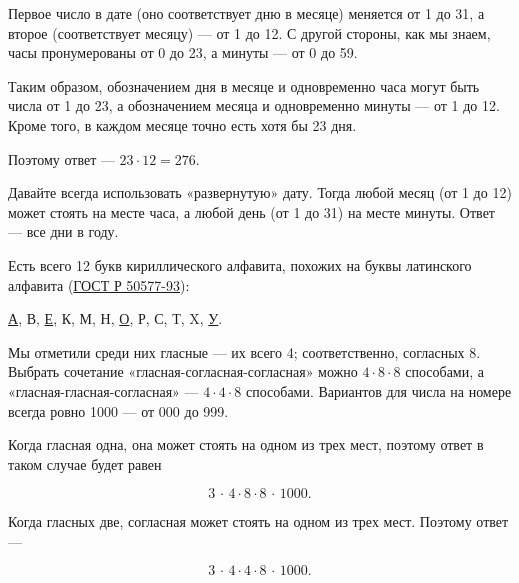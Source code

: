 ﻿
\begin{itemize}
\itA Первое число в дате (оно соответствует дню в месяце) меняется от 1 до 31, а второе (соответствует месяцу) — от 1 до 12. С другой стороны, как мы знаем, часы пронумерованы от 0 до 23, а минуты — от 0 до 59.

\ms Таким образом, обозначением дня в месяце и одновременно часа могут быть числа от 1 до 23, а обозначением месяца и одновременно минуты — от 1 до 12. Кроме того, в каждом месяце точно есть хотя бы 23 дня.

\ms Поэтому ответ — $23 \cdot 12 = 276$.

\itB Давайте всегда использовать «развернутую» дату. Тогда любой месяц (от 1 до 12) может стоять на месте часа, а любой день (от 1 до 31) на месте минуты. Ответ — все дни в году.

\itC Есть всего 12 букв кириллического алфавита, похожих на буквы латинского алфавита (\href{http://base.garant.ru/12142212}{ГОСТ Р 50577-93}): \medskip

\centerline{{\underline А}, В, {\underline Е}, К, М, Н, {\underline О}, Р, С, Т, X, {\underline У}.}

\ms Мы отметили среди них гласные — их всего 4; соответственно, согласных 8. Выбрать сочетание «гласная-согласная-согласная» можно $4 \cdot 8 \cdot 8$ способами, а «гласная-гласная-согласная» — $4 \cdot 4 \cdot 8$ способами. Вариантов для числа на номере всегда ровно 1000 — от 000 до 999.

\ms Когда гласная одна, она может стоять на одном из трех мест, поэтому ответ в таком случае будет равен

$$3\,\cdot\,4\cdot8\cdot8\,\cdot\,1000.$$

\ms Когда гласных две, согласная может стоять на одном из трех мест. Поэтому ответ —

$$3\,\cdot\,4\cdot4\cdot8\,\cdot\,1000.$$
\end{itemize}